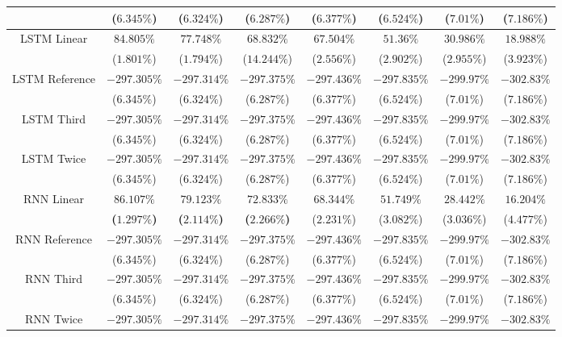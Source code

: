 \begin{table}[!ht]
{\begin{tabular}{|c|c|c|c|c|c|c|c|}
			 & ($6.345\%$) & ($6.324\%$) & ($6.287\%$) & ($6.377\%$) & ($6.524\%$) & ($7.01\%$) & ($7.186\%$) \\ \hline
			\multirow{2}{*}{LSTM Linear} & $84.805\%$ & $77.748\%$ & $68.832\%$ & $67.504\%$ & $51.36\%$ & $30.986\%$ & $18.988\%$ \\
			 & ($1.801\%$) & ($1.794\%$) & ($14.244\%$) & ($2.556\%$) & ($2.902\%$) & ($2.955\%$) & ($3.923\%$) \\ \hline
			\multirow{2}{*}{LSTM Reference} & $-297.305\%$ & $-297.314\%$ & $-297.375\%$ & $-297.436\%$ & $-297.835\%$ & $-299.97\%$ & $-302.83\%$ \\
			 & ($6.345\%$) & ($6.324\%$) & ($6.287\%$) & ($6.377\%$) & ($6.524\%$) & ($7.01\%$) & ($7.186\%$) \\ \hline
			\multirow{2}{*}{LSTM Third} & $-297.305\%$ & $-297.314\%$ & $-297.375\%$ & $-297.436\%$ & $-297.835\%$ & $-299.97\%$ & $-302.83\%$ \\
			 & ($6.345\%$) & ($6.324\%$) & ($6.287\%$) & ($6.377\%$) & ($6.524\%$) & ($7.01\%$) & ($7.186\%$) \\ \hline
			\multirow{2}{*}{LSTM Twice} & $-297.305\%$ & $-297.314\%$ & $-297.375\%$ & $-297.436\%$ & $-297.835\%$ & $-299.97\%$ & $-302.83\%$ \\
			 & ($6.345\%$) & ($6.324\%$) & ($6.287\%$) & ($6.377\%$) & ($6.524\%$) & ($7.01\%$) & ($7.186\%$) \\ \hline
			\multirow{2}{*}{RNN Linear} & $\mathbf{86.107\%}$ & $\mathbf{79.123\%}$ & $\mathbf{72.833\%}$ & $68.344\%$ & $51.749\%$ & $28.442\%$ & $16.204\%$ \\
			 & \textbf{(}$\mathbf{1.297\%}$\textbf{)} & \textbf{(}$\mathbf{2.114\%}$\textbf{)} & \textbf{(}$\mathbf{2.266\%}$\textbf{)} & ($2.231\%$) & ($3.082\%$) & ($3.036\%$) & ($4.477\%$) \\ \hline
			\multirow{2}{*}{RNN Reference} & $-297.305\%$ & $-297.314\%$ & $-297.375\%$ & $-297.436\%$ & $-297.835\%$ & $-299.97\%$ & $-302.83\%$ \\
			 & ($6.345\%$) & ($6.324\%$) & ($6.287\%$) & ($6.377\%$) & ($6.524\%$) & ($7.01\%$) & ($7.186\%$) \\ \hline
			\multirow{2}{*}{RNN Third} & $-297.305\%$ & $-297.314\%$ & $-297.375\%$ & $-297.436\%$ & $-297.835\%$ & $-299.97\%$ & $-302.83\%$ \\
			 & ($6.345\%$) & ($6.324\%$) & ($6.287\%$) & ($6.377\%$) & ($6.524\%$) & ($7.01\%$) & ($7.186\%$) \\ \hline
			\multirow{2}{*}{RNN Twice} & $-297.305\%$ & $-297.314\%$ & $-297.375\%$ & $-297.436\%$ & $-297.835\%$ & $-299.97\%$ & $-302.83\%$ \\

\end{tabular}}
\end{table}

